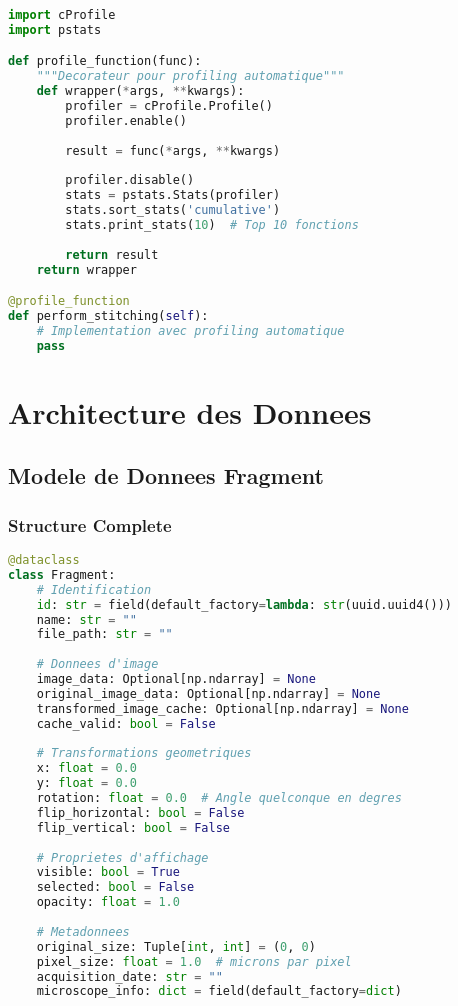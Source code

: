 \documentclass[12pt,a4paper]{article}
\begin{document}
\begin{lstlisting}[language=Python]
import cProfile
import pstats

def profile_function(func):
    """Decorateur pour profiling automatique"""
    def wrapper(*args, **kwargs):
        profiler = cProfile.Profile()
        profiler.enable()
        
        result = func(*args, **kwargs)
        
        profiler.disable()
        stats = pstats.Stats(profiler)
        stats.sort_stats('cumulative')
        stats.print_stats(10)  # Top 10 fonctions
        
        return result
    return wrapper

@profile_function
def perform_stitching(self):
    # Implementation avec profiling automatique
    pass
\end{lstlisting}

\section{Architecture des Donnees}

\subsection{Modele de Donnees Fragment}

\subsubsection{Structure Complete}

\begin{lstlisting}[language=Python]
@dataclass
class Fragment:
    # Identification
    id: str = field(default_factory=lambda: str(uuid.uuid4()))
    name: str = ""
    file_path: str = ""
    
    # Donnees d'image
    image_data: Optional[np.ndarray] = None
    original_image_data: Optional[np.ndarray] = None
    transformed_image_cache: Optional[np.ndarray] = None
    cache_valid: bool = False
    
    # Transformations geometriques
    x: float = 0.0
    y: float = 0.0
    rotation: float = 0.0  # Angle quelconque en degres
    flip_horizontal: bool = False
    flip_vertical: bool = False
    
    # Proprietes d'affichage
    visible: bool = True
    selected: bool = False
    opacity: float = 1.0
    
    # Metadonnees
    original_size: Tuple[int, int] = (0, 0)
    pixel_size: float = 1.0  # microns par pixel
    acquisition_date: str = ""
    microscope_info: dict = field(default_factory=dict)
\end{lstlisting}
\end{document}

